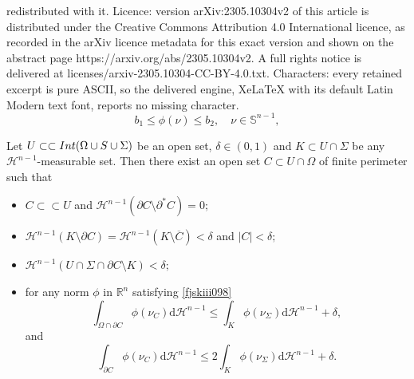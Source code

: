 \documentclass[10pt,a4paper]{amsart}
\newcommand{\Ins}[1]{{\rm Int}{(#1\cup \substrate\cup \Sigma)}}
\newcommand{\R}{\mathbb{R}}
\newcommand{\bound}{b}
\newcommand{\cH}{\mathcal{H}}
\newcommand{\cl}[1]{\overline{#1}}
\newcommand{\p}{\partial}
\newcommand{\strictlyincluded}{\subset\subset}
\newcommand{\substrate}{S}
\renewcommand{\S}{\mathbb{S}}
\renewcommand{\d}{\mathrm{d}}
\begin{document}
redistributed with it. Licence: version arXiv:2305.10304v2 of this article is distributed under the Creative Commons Attribution 4.0 International licence, as recorded in the arXiv licence metadata for this exact version and shown on the abstract page https://arxiv.org/abs/2305.10304v2. A full rights notice is delivered at licenses/arxiv-2305.10304-CC-BY-4.0.txt. Characters: every retained excerpt is pure ASCII, so the delivered engine, XeLaTeX with its default Latin Modern text font, reports no missing character.
 \begin{equation}\label{fjskiii098}
\bound_1\le \phi(\nu) \le \bound_2,\quad \nu\in\S^{n-1},
\end{equation}

\begin{lemma}\label{lem:holes_near_Sigma}
Let $U\strictlyincluded \Ins{\Omega}$ be an open set, $\delta\in(0,1)$ and  $K\subset U\cap\Sigma$ be any $\cH^{n-1}$-measurable set. Then there exist an open set $C\subset U\cap \Omega$ of finite perimeter such that 
\begin{itemize}[left=15pt]
 \item[\rm(i)] $C\strictlyincluded U$ and $\cH^{n-1}(\p C\setminus \p^*C)=0;$
 
 \item[\rm(ii)] $\cH^{n-1}(K\setminus \p C)=\cH^{n-1}(K\setminus \cl{C})<\delta$ and $|C|<\delta;$
 
 \item[\rm(iii)] $\cH^{n-1}(U\cap \Sigma \cap\p C \setminus K)<\delta;$
 
 \item[\rm(iv)] for any norm $\phi$ in $\R^n$ satisfying \eqref{fjskiii098}
 $$
 \int_{\Omega\cap \p C} \phi(\nu_C)\d\cH^{n-1} \le \int_K\phi(\nu_\Sigma) \d\cH^{n-1} +\delta, 
 $$
 and 
 $$
 \int_{\p C} \phi(\nu_C)\d\cH^{n-1} \le 2\int_K\phi(\nu_\Sigma) \d\cH^{n-1} +\delta .
 $$ 
\end{itemize}
\end{lemma}
\end{document}
